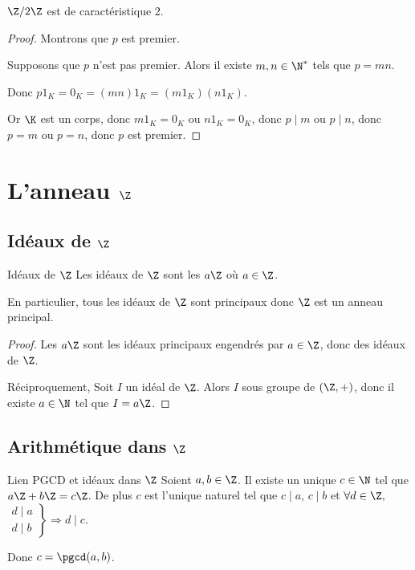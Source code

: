 \begin{exemple}
    $\Z / 2 \Z$ est de caractéristique $2$.
\end{exemple}


\begin{proof}
    Montrons que $p$ est premier. 

    Supposons que $p$ n'est pas premier. Alors il existe $m, n \in \N^*$ tels que 
    $p = mn$. 

    Donc $p1_K = 0_K = (mn)1_K = (m1_K)(n1_K)$.

    Or $\K$ est un corps, donc $m1_K = 0_K$ ou $n1_K = 0_K$, 
    donc $p \mid m$ ou $p \mid n$, donc $p = m$ ou $p = n$, donc $p$ est premier.
\end{proof}

\section{L'anneau \texorpdfstring{$\Z$}{Z}}
\subsection{Idéaux de \texorpdfstring{$\Z$}{Z}}

\begin{theoreme}{Idéaux de $\Z$}{}
    Les idéaux de $\Z$ sont les $a \Z$ où $a \in \Z$.

    En particulier, tous les idéaux de $\Z$ sont principaux donc $\Z$ est un anneau principal.
\end{theoreme}

\begin{proof}
    Les $a \Z$ sont les idéaux principaux engendrés par $a \in \Z$, donc des idéaux de $\Z$.

    Réciproquement, Soit $I$ un idéal de $\Z$. Alors $I$ sous groupe de $(\Z, +)$, donc il existe 
    $a \in \N$ tel que $I = a \Z$.
\end{proof}

\subsection{Arithmétique dans \texorpdfstring{$\Z$}{Z}}

\begin{theoreme}{Lien PGCD et idéaux dans $\Z$}{}
    Soient $a, b \in \Z$. Il existe un unique $c \in \N$ tel que $a \Z + b \Z = c \Z$. 
    De plus $c$ est l'unique naturel tel que $c \mid a $, $c \mid b$ et $\forall d \in \Z, $
    $\left. \begin{aligned}
        d \mid a \\
        d \mid b
    \end{aligned} \right\} \Rightarrow d \mid c$.

    Donc $c = \pgcd(a, b)$.
\end{theoreme}

